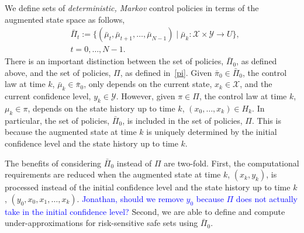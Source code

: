 \documentclass[letterpaper, 10 pt, conference]{ieeeconf}  %
\begin{document}
We define sets of \textit{deterministic, Markov} control policies in terms of the augmented state space as follows,
%
\begin{equation}
\label{augpi}
\begin{aligned}
& \bar{\Pi}_t := \{ (\bar{\mu}_t, \bar{\mu}_{t+1}, \dots, \bar{\mu}_{N-1}) \mid \bar{\mu}_k: \mathcal{X} \times \mathcal{Y} \rightarrow U \},\\
& t = 0, \dots, N-1.
\end{aligned}
\end{equation}
%
There is an important distinction between the set of policies, $\bar{\Pi}_0$, as defined above,
and the set of policies, $\Pi$, as defined in~\eqref{pi}.
Given $\bar{\pi}_0 \in \bar{\Pi}_0$, the control law at time $k$, $\bar{\mu}_k \in \bar{\pi}_0$, 
only depends on the current state, $x_k \in \mathcal{X}$, and the current confidence level, $y_k \in \mathcal{Y}$.
However, given $\pi \in \Pi$, the control law at time $k$, $\mu_k \in \pi$, 
depends on the state history up to time $k$, $(x_0, \dots, x_k) \in H_k$.
In particular, the set of policies, $\bar{\Pi}_0$, is included in the set of policies, $\Pi$.
This is because the augmented state at time $k$ is uniquely determined by the initial confidence level and the state history up to time $k$.\footnotemark 
{}

The benefits of considering $\bar{\Pi}_0$ instead of $\Pi$ are two-fold. 
First, the computational requirements are reduced when the augmented state at time $k$, $(x_k, y_k)$, 
is processed instead of the initial confidence level and the state history up to time $k$, $(y_0, x_0, x_1, \hdots, x_k)$. 
\textcolor{blue}{Jonathan, should we remove $y_0$ because $\Pi$ does not actually take in the initial confidence level?}
Second, we are able to define and compute under-approximations
for risk-sensitive safe sets using $\bar{\Pi}_0$.
\end{document}
